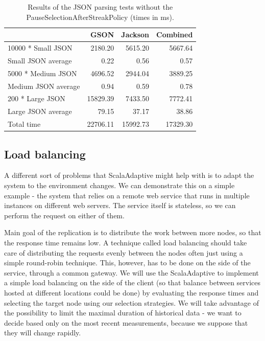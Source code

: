 \begin{table}[h!]
		\captionsetup{justification=centering,margin=0.5cm}
	\bgroup
	\def\arraystretch{1.5}%
	\begin{center}
		\begin{tabular}{ | l | r | r | r | }
			\hline
			& \textbf{GSON} & \textbf{Jackson} & \textbf{Combined} \\ \hline
10000 * Small JSON  & 2180.20       & 5615.20          & 5667.64           \\ \hline
Small JSON average  & 0.22          & 0.56             & 0.57              \\ \hline
5000 * Medium JSON  & 4696.52       & 2944.04          & 3889.25           \\ \hline
Medium JSON average & 0.94          & 0.59             & 0.78              \\ \hline
200 * Large JSON    & 15829.39      & 7433.50          & 7772.41           \\ \hline
Large JSON average  & 79.15         & 37.17            & 38.86             \\ \hline
Total time          & 22706.11      & 15992.73         & 17329.30          \\ \hline
		\end{tabular}
	\end{center}
	\egroup
	\caption{Results of the JSON parsing tests without the PauseSelectionAfterStreakPolicy (times in ms).}
	\label{tab:json_parsing_results_no_policy}
\end{table}

\subsection{Load balancing}

A different sort of problems that ScalaAdaptive might help with is to adapt the system to the environment changes. We can demonstrate this on a simple example - the system that relies on a remote web service that runs in multiple instances on different web servers. The service itself is stateless, so we can perform the request on either of them. 

Main goal of the replication is to distribute the work between more nodes, so that the response time remains low. A technique called load balancing should take care of distributing the requests evenly between the nodes often just using a simple round-robin technique. This, however, has to be done on the side of the service, through a common gateway. We will use the ScalaAdaptive to implement a simple load balancing on the side of the client (so that balance between services hosted at different locations could be done) by evaluating the response times and selecting the target node using our selection strategies. We will take advantage of the possibility to limit the maximal duration of historical data - we want to decide based only on the most recent measurements, because we suppose that they will change rapidly.

